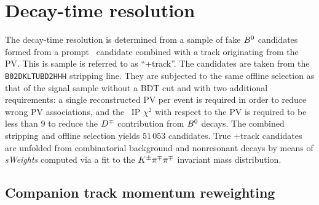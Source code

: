 \section{Decay-time resolution}
\label{sec:time:resol}

The decay-time resolution is determined from a sample of fake $B^0$ candidates formed from a prompt \Dpm~candidate combined with a track originating from the PV. This is sample is referred to as ``\Dpm+track''. The candidates are taken from the \texttt{B02DKLTUBD2HHH} stripping line. They are subjected to the same offline selection as that of the signal sample without a BDT cut and with two additional requirements: a single reconstructed PV per event is required in order to reduce wrong PV associations, and the \Dpm~IP $\chi^{2}$ with respect to the PV is required to be less than 9 to reduce the $D^\mp$ contribution from $B^0$ decays. The combined stripping and offline selection yields $51\,053$ candidates. True \Dpm+track candidates are unfolded from combinatorial background and nonresonant decays by means of \emph{sWeights} computed via a fit to the $K^\pm\pi^\mp\pi^\mp$ invariant mass distribution.

\subsection{Companion track momentum reweighting}


